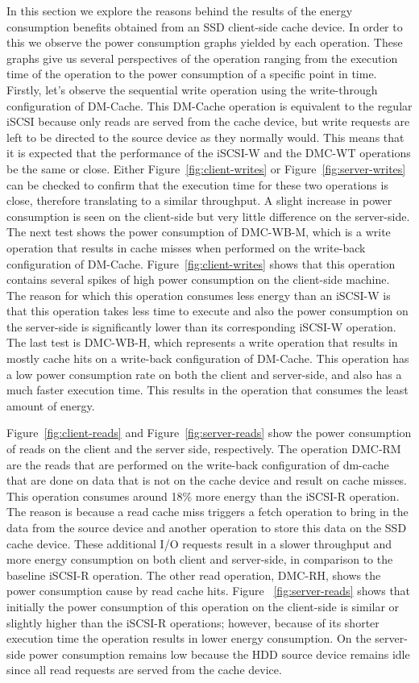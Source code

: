 In this section we explore the reasons behind the results of the energy
consumption benefits obtained from an SSD client-side cache device. In order to
this we observe the power consumption graphs yielded by each operation. These
graphs give us several perspectives of the operation ranging from the execution
time of the operation to the power consumption of a specific point in
time. Firstly, let's observe the sequential write operation using the
write-through configuration of DM-Cache. This DM-Cache operation is equivalent
to the regular iSCSI because only reads are served from the cache device, but
write requests are left to be directed to the source device as they normally
would. This means that it is expected that the performance of the iSCSI-W and
the DMC-WT operations be the same or close. Either
Figure~\ref{fig:client-writes} or Figure~\ref{fig:server-writes} can be checked
to confirm that the execution time for these two operations is close, therefore
translating to a similar throughput. A slight increase in power consumption is
seen on the client-side but very little difference on the server-side. The next
test shows the power consumption of DMC-WB-M, which is a write operation that
results in cache misses when performed on the write-back configuration of
DM-Cache. Figure~\ref{fig:client-writes} shows that this operation contains
several spikes of high power consumption on the client-side machine. The reason
for which this operation consumes less energy than an iSCSI-W is that this
operation takes less time to execute and also the power consumption on the
server-side is significantly lower than its corresponding iSCSI-W operation. The
last test is DMC-WB-H, which represents a write operation that results in mostly
cache hits on a write-back configuration of DM-Cache. This operation has a low
power consumption rate on both the client and server-side, and also has a much
faster execution time. This results in the operation that consumes the least
amount of energy.

Figure~\ref{fig:client-reads} and Figure~\ref{fig:server-reads} show the power
consumption of reads on the client and the server side, respectively. The
operation DMC-RM are the reads that are performed on the write-back
configuration of dm-cache that are done on data that is not on the cache device
and result on cache misses. This operation consumes around 18\% more energy than
the iSCSI-R operation. The reason is because a read cache miss triggers a fetch
operation to bring in the data from the source device and another operation to
store this data on the SSD cache device. These additional I/O requests result in
a slower throughput and more energy consumption on both client and server-side,
in comparison to the baseline iSCSI-R operation.  The other read operation,
DMC-RH, shows the power consumption cause by read cache hits. Figure
~\ref{fig:server-reads} shows that initially the power consumption of this
operation on the client-side is similar or slightly higher than the iSCSI-R
operations; however, because of its shorter execution time the operation results
in lower energy consumption. On the server-side power consumption remains low
because the HDD source device remains idle since all read requests are served
from the cache device.
